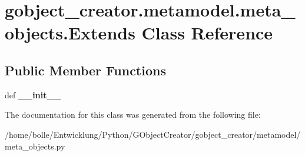 \hypertarget{classgobject__creator_1_1metamodel_1_1meta__objects_1_1Extends}{
\section{gobject\_\-creator.metamodel.meta\_\-objects.Extends Class Reference}
\label{classgobject__creator_1_1metamodel_1_1meta__objects_1_1Extends}
}
\subsection*{Public Member Functions}
\begin{DoxyCompactItemize}
\item 
\hypertarget{classgobject__creator_1_1metamodel_1_1meta__objects_1_1Extends_af2c2957ff6bfb550769d478ce46deae0}{
def {\bfseries \_\-\_\-init\_\-\_\-}}
\label{classgobject__creator_1_1metamodel_1_1meta__objects_1_1Extends_af2c2957ff6bfb550769d478ce46deae0}

\end{DoxyCompactItemize}


The documentation for this class was generated from the following file:\begin{DoxyCompactItemize}
\item 
/home/bolle/Entwicklung/Python/GObjectCreator/gobject\_\-creator/metamodel/meta\_\-objects.py\end{DoxyCompactItemize}
